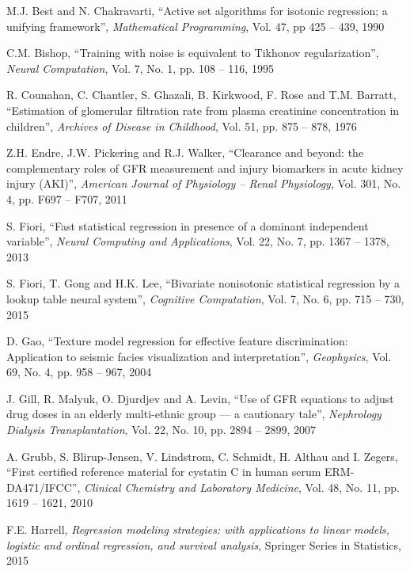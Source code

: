 \documentclass[10pt,final]{siamltex}
\begin{document}
\begin{thebibliography}{99}
   M.J. Best and N. Chakravarti, ``Active set algorithms for isotonic regression; a unifying framework'', \textit{Mathematical Programming}, Vol. 47, pp 425 -- 439, 1990

   C.M. Bishop, ``Training with noise is equivalent to Tikhonov regularization'', \textit{Neural Computation}, Vol. 7, No. 1, pp. 108 -- 116, 1995

   R. Counahan, C. Chantler, S. Ghazali, B. Kirkwood, F. Rose and T.M. Barratt, ``Estimation of glomerular filtration rate from plasma creatinine concentration in children'', \textit{Archives of Disease in Childhood},  Vol. 51, pp. 875 -- 878, 1976

   Z.H. Endre, J.W. Pickering and R.J. Walker, ``Clearance and beyond: the complementary roles of GFR measurement and injury biomarkers in acute kidney injury (AKI)'', \textit{American Journal of Physiology -- Renal Physiology}, Vol. 301, No. 4, pp. F697 -- F707, 2011

   S. Fiori, ``Fast statistical regression in presence of a dominant independent variable'', \textit{Neural Computing and Applications}, Vol. 22, No. 7, pp. 1367 -- 1378, 2013

   S. Fiori, T. Gong and H.K. Lee, ``Bivariate nonisotonic statistical regression by a lookup table neural system'', \textit{Cognitive Computation}, Vol. 7, No. 6, pp. 715 -- 730, 2015

   D. Gao, ``Texture model regression for effective feature discrimination: Application to seismic facies visualization and interpretation'', \textit{Geophysics}, Vol. 69, No. 4, pp. 958 -- 967, 2004

   J. Gill, R. Malyuk, O. Djurdjev and A. Levin, ``Use of GFR equations to adjust drug doses in an elderly multi-ethnic group --- a cautionary tale'', \textit{Nephrology Dialysis Transplantation}, Vol. 22, No. 10, pp. 2894 -- 2899, 2007

   A. Grubb, S. Blirup-Jensen, V. Lindstrom, C. Schmidt, H. Althau and I. Zegers, ``First certified reference material for cystatin C in human serum ERM-DA471/IFCC'', \textit{Clinical Chemistry and Laboratory Medicine}, Vol. 48, No. 11, pp. 1619 -- 1621, 2010

   F.E. Harrell, \textit{Regression modeling strategies: with applications to linear models, logistic and ordinal regression, and survival analysis}, Springer Series in Statistics, 2015


\end{thebibliography}
\end{document}

